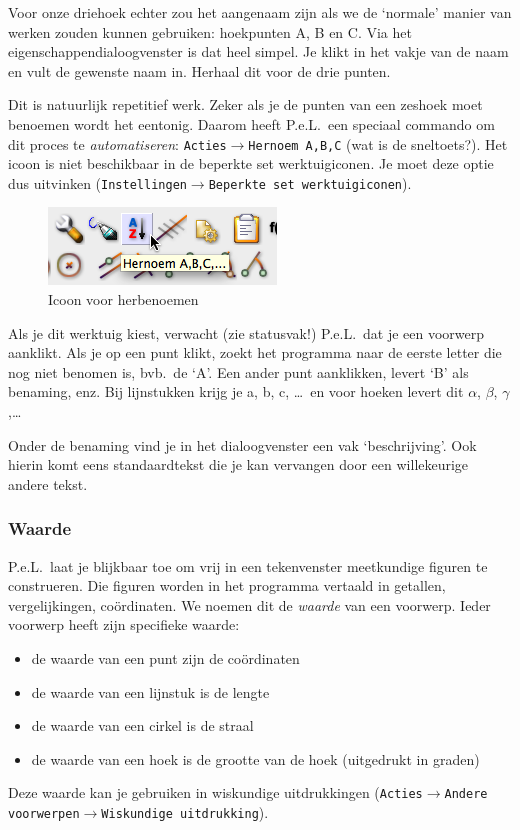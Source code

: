 Voor onze driehoek echter zou het aangenaam zijn als we de `normale' manier van werken zouden kunnen gebruiken: hoekpunten A, B en C. Via het eigenschappendialoogvenster is dat heel simpel. Je klikt in het vakje van de naam en vult de gewenste naam in. Herhaal dit voor de drie punten.

Dit is natuurlijk repetitief werk. Zeker als je de punten van een zeshoek moet benoemen wordt het eentonig. Daarom heeft P.e.L.\ een speciaal commando om dit proces te \emph{automatiseren}: \texttt{Acties$\rightarrow$Hernoem A,B,C} (wat is de sneltoets?).  Het icoon is  niet beschikbaar in de beperkte set werktuigiconen. Je moet deze optie dus uitvinken (\texttt{Instellingen$\rightarrow$Beperkte set werktuigiconen}).
\begin{figure}[htb]
    \centering
    \includegraphics[]{figuren/PeL/herbenoemABC.png}
       \caption{Icoon voor herbenoemen}
    \label{fig:herbenoemicoon}
\end{figure}
Als je dit werktuig kiest, verwacht (zie statusvak!) P.e.L.\ dat je een voorwerp aanklikt. Als je op een punt klikt, zoekt het programma naar de eerste letter die nog niet benomen is, bvb.\ de `A'. Een ander punt aanklikken, levert `B' als benaming, enz. Bij lijnstukken krijg je a, b, c, \dots\ en voor hoeken levert dit $\alpha$, $\beta$, $\gamma$,\dots

Onder de benaming vind je in het dialoogvenster een vak `beschrijving'. Ook hierin komt eens standaardtekst die je kan vervangen door een willekeurige andere tekst. 

\subsubsection{Waarde}
P.e.L.\ laat je blijkbaar toe om vrij in een tekenvenster meetkundige figuren te construeren. Die figuren worden in het programma vertaald in getallen, vergelijkingen, co\"{o}rdinaten. We noemen dit de \emph{waarde} van een voorwerp. Ieder voorwerp heeft zijn specifieke waarde:
\begin{itemize}
\item de waarde van een punt zijn de co\"ordinaten
\item de waarde van een lijnstuk is de lengte
\item de waarde van een cirkel is de  straal
\item de waarde van een hoek is de grootte van de hoek (uitgedrukt in graden)
\end{itemize}
Deze waarde kan je gebruiken in wiskundige uitdrukkingen (\texttt{Acties$\rightarrow$Andere voorwerpen$\rightarrow$Wiskundige uitdrukking}).

